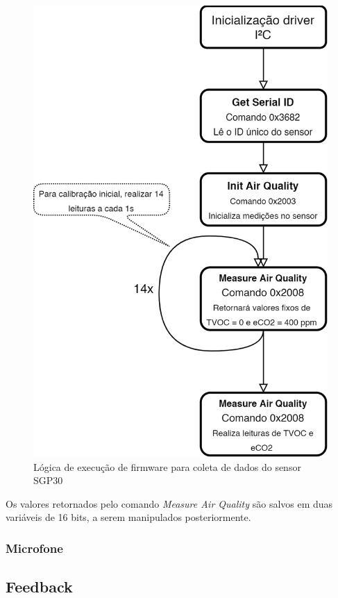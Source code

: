 \documentclass[../monografia.tex]{subfiles}
\begin{document}
\begin{figure}[h]
	\centering
	\includegraphics[scale=0.2]{sgp30_firmware.png}
	\caption{Lógica de execução de firmware para coleta de dados do sensor SGP30}
	\label{fig:sgp30_firmware}
\end{figure}

Os valores retornados pelo comando \textit{Measure Air Quality} são salvos em duas variáveis de 16 bits, a serem manipulados posteriormente.

\subsubsection{Microfone}
\subsection{Feedback}
\end{document}
